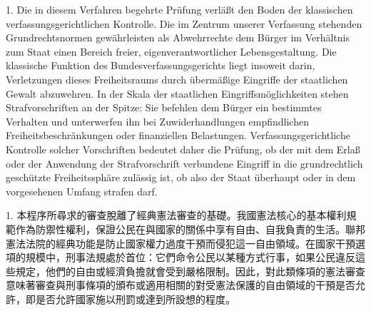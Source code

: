 \documentclass[12pt]{article}
\begin{document}
\syncleft
\begin{sourcepara}
1. Die in diesem Verfahren begehrte Prüfung verläßt den Boden der klassischen verfassungsgerichtlichen Kontrolle. Die im Zentrum unserer Verfassung stehenden Grundrechtsnormen gewährleisten als Abwehrrechte dem Bürger im Verhältnis zum Staat einen Bereich freier, eigenverantwortlicher Lebensgestaltung. Die klassische Funktion des Bundesverfassungsgerichts liegt insoweit darin, Verletzungen dieses Freiheitsraums durch übermäßige Eingriffe der staatlichen Gewalt abzuwehren. In der Skala der staatlichen Eingriffsmöglichkeiten stehen Strafvorschriften an der Spitze: Sie befehlen dem Bürger ein bestimmtes Verhalten und unterwerfen ihn bei Zuwiderhandlungen empfindlichen Freiheitsbeschränkungen oder finanziellen Belastungen. Verfassungsgerichtliche Kontrolle solcher Vorschriften bedeutet daher die Prüfung, ob der mit dem Erlaß oder der Anwendung der Strafvorschrift verbundene Eingriff in die grundrechtlich geschützte Freiheitssphäre zulässig ist, ob also der Staat überhaupt oder in dem vorgesehenen Umfang strafen darf.
\end{sourcepara}
\begin{transpara}
1. 本程序所尋求的審查脫離了經典憲法審查的基礎。我國憲法核心的基本權利規範作為防禦性權利，保證公民在與國家的關係中享有自由、自我負責的生活。聯邦憲法法院的經典功能是防止國家權力過度干預而侵犯這一自由領域。在國家干預選項的規模中，刑事法規處於首位：它們命令公民以某種方式行事，如果公民違反這些規定，他們的自由或經濟負擔就會受到嚴格限制。因此，對此類條項的憲法審查意味著審查與刑事條項的頒布或適用相關的對受憲法保護的自由領域的干預是否允許，即是否允許國家施以刑罰或達到所設想的程度。
\end{transpara}
\end{document}
